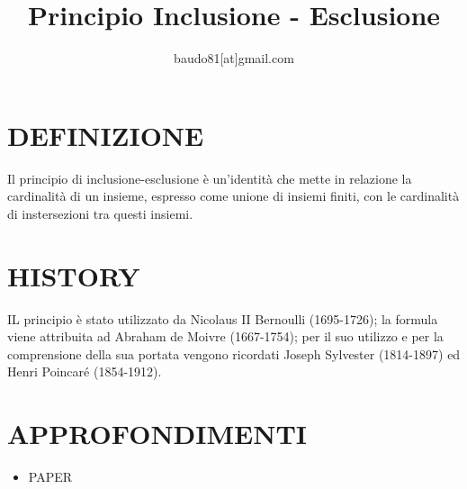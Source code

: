 \documentclass[a4paper,10pt]{article}
\title{Principio Inclusione - Esclusione}
\author{baudo81[at]gmail.com}
\begin{document}
\maketitle

\section{DEFINIZIONE}
Il principio di inclusione-esclusione è un'identità che mette in relazione la cardinalità di un insieme, espresso come unione di insiemi finiti,
con le cardinalità di instersezioni tra questi insiemi.

\section{HISTORY}
IL principio è stato utilizzato da Nicolaus II Bernoulli (1695-1726); la formula viene attribuita ad Abraham de Moivre (1667-1754);
per il suo utilizzo e per la comprensione della sua portata vengono ricordati Joseph Sylvester (1814-1897) ed Henri Poincaré (1854-1912). 

\section{APPROFONDIMENTI}
\begin{itemize}
 \item PAPER \cite{pinclescl}
\end{itemize}



\end{document}
